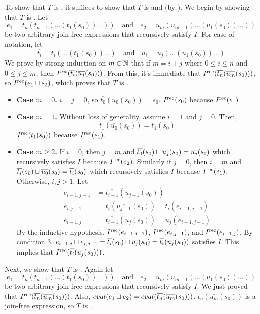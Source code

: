 \begin{elidableproof}
  \newcommand{\bart}[1]{\overline{t_{#1}}}
  \newcommand{\baru}[1]{\overline{u_{#1}}}

  To show that $T$ is \Iconfluent{}, it suffices to show that $T$ is
  \dIconfluent{} and \dIreducible{} (by
  ). We begin by showing
  that $T$ is \dIconfluent{}. Let
  \[
    e_1 = t_n(t_{n-1}(\ldots (t_1(s_0))\ldots))
    \quad \text{and} \quad
    e_2 = u_m(u_{m-1}(\ldots (u_1(s_0))\ldots))
  \]
  be two arbitrary join-free expressions that recursively satisfy $I$. For ease
  of notation, let
  \[
    \bart{i} = t_i(\ldots(t_1(s_0))\ldots)
    \quad\text{and}\quad
    \baru{i} = u_j(\ldots(u_1(s_0))\ldots)
  \]
  We prove by strong induction on $m \in \mathbb{N}$ that if $m = i + j$ where $0
  \leq i \leq n$ and $0 \leq j \leq m$, then $\Irec{\bart{i}(\baru{j}(s_0))}$.
  From this, it's immediate that $\Irec{\bart{n}(\baru{m}(s_0))}$, so
  $I^{\text{rec}}(e_1 \sqcup e_2)$, which proves that $T$ is \dIconfluent{}.
  \begin{itemize}
    \item \textbf{Case $m = 0$.}
      $i = j = 0$, so $\bart{0}(\baru{0}(s_0)) = s_0$. $I^{\text{rec}}(s_0)$ because
      $I^{\text{rec}}(e_1)$.

    \item \textbf{Case $m = 1$.}
      Without loss of generality, assume $i = 1$ and $j = 0$. Then,
      \[
        \bart{1}(\baru{0}(s_0))
          = t_1(s_0)
      \]
      $I^{\text{rec}}(t_1(s_0))$ because $I^{\text{rec}}(e_1)$.

    \item \textbf{Case $m \geq 2$.}
      If $i = 0$, then $j = m$ and $\bart{0}(s_0) \join \baru{j}(s_0) =
      \baru{j}(s_0)$ which recursively satisfies $I$ because $I^{\text{rec}}(e_2)$.
      Similarly if $j = 0$, then $i = m$ and $\bart{i}(s_0) \join \baru{0}(s_0)
      = \bart{i}(s_0)$ which recursively satisfies $I$ because $I^{\text{rec}}(e_1)$.
      Otherwise, $i, j > 1$. Let
      \begin{align*}
        e_{i-1,j-1}
          &= \bart{i-1}(\baru{j-1}(s_0)) \\
        e_{i,j-1}
          &= \bart{i}(\baru{j-1}(s_0))
           = t_i(e_{i-1,j-1}) \\
        e_{i-1,j}
          &= \bart{i-1}(\baru{j}(s_0))
           = u_j(e_{i-1,j-1})
      \end{align*}
      By the inductive hypothesis, $I^{\text{rec}}(e_{i-1,j-1})$, $I^{\text{rec}}(e_{i,j-1})$,
      and $I^{\text{rec}}(e_{i-1,j})$. By condition 3, $e_{i-1,j} \join e_{i,j-1} =
      \bart{i}(s_0) \join \baru{j}(s_0) = \bart{i}(\baru{j}(s_0))$ satisfies
      $I$. This implies that $\Irec{\bart{i}(\baru{j}(s_0))}$.
  \end{itemize}

  Next, we show that $T$ is \dIreducible{}. Again let
  \[
    e_1 = t_n(t_{n-1}(\ldots (t_1(s_0))\ldots))
    \quad \text{and} \quad
    e_2 = u_m(u_{m-1}(\ldots (u_1(s_0))\ldots))
  \]
  be two arbitrary join-free expressions that recursively satisfy $I$. We just
  proved that $\Irec{\bart{n}(\baru{m}(s_0))}$. Also, $eval(e_1 \join e_2) =
  eval(\bart{n}(\baru{m}(s_0)))$. $\bart{n}(\baru{m}(s_0))$ is a join-free
  expression, so $T$ is \dIreducible{}.
\end{elidableproof}
